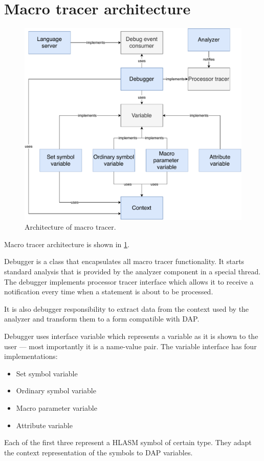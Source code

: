 \section{Macro tracer architecture}
\begin{figure}
	\centering
	\includegraphics[width=\textwidth]{img/macro_tracer_arch}
	\caption{Architecture of macro tracer.}
	\label{macro_tracer_arch}
\end{figure}

Macro tracer architecture is shown in \cref{macro_tracer_arch}.

Debugger is a class that encapsulates all macro tracer functionality. It starts standard analysis that is provided by the analyzer component in a special thread. The debugger implements processor tracer interface which allows it to receive a notification every time when a statement is about to be processed.

It is also debugger responsibility to extract data from the context used by the analyzer and transform them to a form compatible with DAP.

Debugger uses interface variable which represents a variable as it is shown to the user --- most importantly it is a name-value pair. The variable interface has four implementations:
\begin{itemize}
	\item Set symbol variable
	\item Ordinary symbol variable
	\item Macro parameter variable
	\item Attribute variable
\end{itemize}
Each of the first three represent a HLASM symbol of certain type. They adapt the context representation of the symbols to DAP variables.

